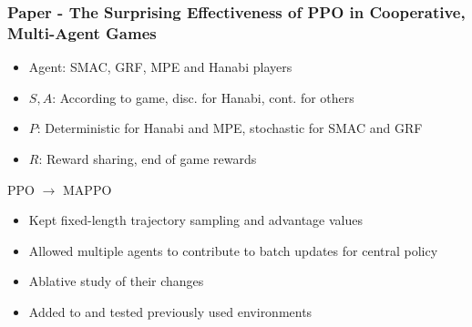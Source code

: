 \documentclass{beamer}
\begin{document}
\begin{frame} 
    \frametitle{Paper \thepapercounter - The Surprising Effectiveness of PPO in Cooperative, 
    Multi-Agent Games}
    \begin{description}\small
        \item[Model:] 
        \begin{itemize} 
            \item Agent: SMAC, GRF, MPE and Hanabi players
            \item $S,A$: According to game, disc. for Hanabi, cont. for others
            \item $P$: Deterministic for Hanabi and MPE, stochastic for SMAC and GRF
            \item $R$: Reward sharing, end of game rewards
        \end{itemize}
        \item[Algorithm:] PPO\cite{schulman2017a} $\rightarrow$ MAPPO
        \begin{itemize}
            \item Kept fixed-length trajectory sampling and advantage values
            \item Allowed multiple agents to contribute to batch updates for central policy
        \end{itemize}
        \item[Strengths:]
        \begin{itemize}
            \item Ablative study of their changes
            \item Added to and tested previously used environments
        \end{itemize}
    \end{description}
\end{frame}
\end{document}
